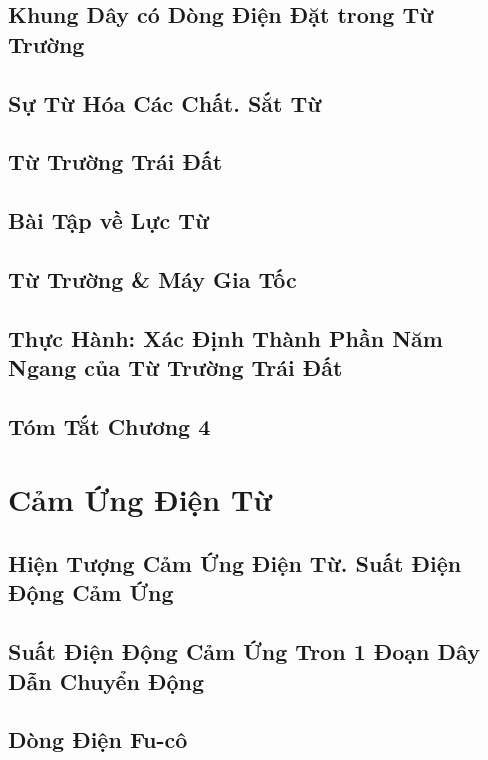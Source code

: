 \documentclass[oneside]{book}
\numberwithin{equation}{section}
\begin{document}
\section{Khung Dây có Dòng Điện Đặt trong Từ Trường}

\section{Sự Từ Hóa Các Chất. Sắt Từ}

\section{Từ Trường Trái Đất}

\section{Bài Tập về Lực Từ}

\section{Từ Trường \& Máy Gia Tốc}

\section{Thực Hành: Xác Định Thành Phần Năm Ngang của Từ Trường Trái Đất}

\section{Tóm Tắt Chương 4}


\chapter{Cảm Ứng Điện Từ}

\section{Hiện Tượng Cảm Ứng Điện Từ. Suất Điện Động Cảm Ứng}

\section{Suất Điện Động Cảm Ứng Tron 1 Đoạn Dây Dẫn Chuyển Động}

\section{Dòng Điện Fu-cô}
\end{document}
